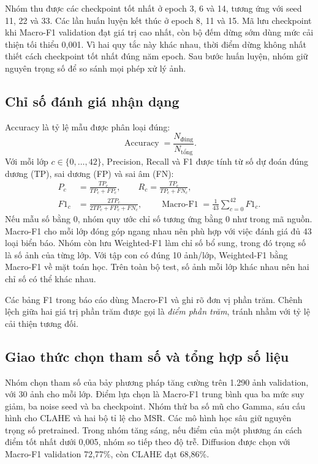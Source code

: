 Nhóm thu được các checkpoint tốt nhất ở epoch 3, 6 và 14, tương ứng với seed 11, 22 và 33. Các lần huấn luyện kết thúc ở epoch 8, 11 và 15. Mã lưu checkpoint khi Macro-F1 validation đạt giá trị cao nhất, còn bộ đếm dừng sớm dùng mức cải thiện tối thiểu 0,001. Vì hai quy tắc này khác nhau, thời điểm dừng không nhất thiết cách checkpoint tốt nhất đúng năm epoch. Sau bước huấn luyện, nhóm giữ nguyên trọng số để so sánh mọi phép xử lý ảnh.

\subsection{Chỉ số đánh giá nhận dạng}
Accuracy là tỷ lệ mẫu được phân loại đúng:
\begin{equation}
\operatorname{Accuracy}=\frac{N_{\mathrm{đúng}}}{N_{\mathrm{tổng}}}.
\end{equation}
Với mỗi lớp $c\in\{0,\ldots,42\}$, Precision, Recall và F1 được tính từ số dự đoán đúng dương (TP), sai dương (FP) và sai âm (FN):
\begin{align}
P_c&=\frac{TP_c}{TP_c+FP_c},\qquad
R_c=\frac{TP_c}{TP_c+FN_c},\\
F1_c&=\frac{2TP_c}{2TP_c+FP_c+FN_c},\qquad
\operatorname{Macro\text{-}F1}=\frac{1}{43}\sum_{c=0}^{42}F1_c.
\end{align}
Nếu mẫu số bằng 0, nhóm quy ước chỉ số tương ứng bằng 0 như trong mã nguồn. Macro-F1 cho mỗi lớp đóng góp ngang nhau nên phù hợp với việc đánh giá đủ 43 loại biển báo. Nhóm còn lưu Weighted-F1 làm chỉ số bổ sung, trong đó trọng số là số ảnh của từng lớp. Với tập con có đúng 10 ảnh/lớp, Weighted-F1 bằng Macro-F1 về mặt toán học. Trên toàn bộ test, số ảnh mỗi lớp khác nhau nên hai chỉ số có thể khác nhau.

Các bảng F1 trong báo cáo dùng Macro-F1 và ghi rõ đơn vị phần trăm. Chênh lệch giữa hai giá trị phần trăm được gọi là \textit{điểm phần trăm}, tránh nhầm với tỷ lệ cải thiện tương đối.



\subsection{Giao thức chọn tham số và tổng hợp số liệu}
Nhóm chọn tham số của bảy phương pháp tăng cường trên 1.290 ảnh validation, với 30 ảnh cho mỗi lớp. Điểm lựa chọn là Macro-F1 trung bình qua ba mức suy giảm, ba noise seed và ba checkpoint. Nhóm thử ba số mũ cho Gamma, sáu cấu hình cho CLAHE và hai bộ tỉ lệ cho MSR. Các mô hình học sâu giữ nguyên trọng số pretrained. Trong nhóm tăng sáng, nếu điểm của một phương án cách điểm tốt nhất dưới 0,005, nhóm so tiếp theo độ trễ. Diffusion được chọn với Macro-F1 validation 72,77\%, còn CLAHE đạt 68,86\%.

